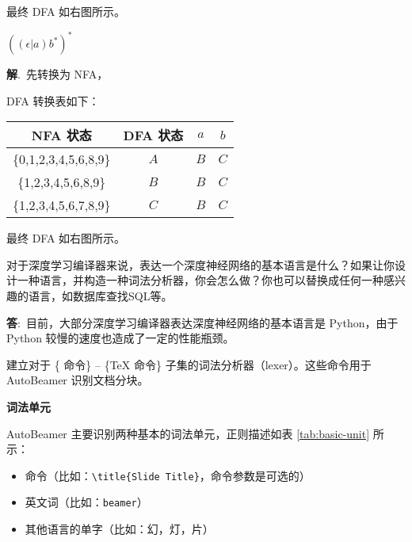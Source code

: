 \documentclass[12pt,a4paper]{article}
\newenvironment{problems}{\begin{list}{}{\renewcommand{\makelabel}[1]{\textbf{##1}\hfil}}}{\end{list}}
\newenvironment{steps}{\begin{list}{}{\renewcommand{\makelabel}[1]{##1)\hfil}}}{\end{list}}
\providecommand{\ans}{\textbf{答}:~}
\providecommand{\sol}{\textbf{解}.~}
\begin{document}
\begin{problems}
\begin{steps}
\begin{multicols}{2}
        最终 DFA 如右图所示。

        

        \end{multicols}

        \item[c] $((\epsilon|a)b^*)^*$ 
        
        \sol 先转换为 NFA，

        

        \begin{multicols}{2}
            DFA 转换表如下：
        
        \begin{tabular}{cc|cc}
            \hline
            NFA 状态 & DFA 状态 & $a$ & $b$ \\
            \hline
            \{0,1,2,3,4,5,6,8,9\} & $A$ & $B$ & $C$ \\
            \{1,2,3,4,5,6,8,9\} & $B$ & $B$ & $C$ \\
            \{1,2,3,4,5,6,7,8,9\} & $C$ & $B$ & $C$ \\
            \hline
        \end{tabular}

        最终 DFA 如右图所示。

        

        \end{multicols}


    \end{steps} 
    \item[2] 对于深度学习编译器来说，表达一个深度神经网络的基本语言是什么？如果让你设计一种语言，并构造一种词法分析器，你会怎么做？你也可以替换成任何一种感兴趣的语言，如数据库查找SQL等。
    
    \ans 目前，大部分深度学习编译器表达深度神经网络的基本语言是 Python，由于 Python 较慢的速度也造成了一定的性能瓶颈。\cite{Li2021} 


    建立对于 \{\LaTeXe{} 命令\} -- \{\TeX{} 命令\} 子集的词法分析器（lexer）。这些命令用于 \textsf{AutoBeamer} 识别文档分块。

\textbf{词法单元}

\textsf{AutoBeamer} 主要识别两种基本的词法单元，正则描述如表 \ref{tab:basic-unit} 所示：
\begin{itemize}
    \item 命令（比如：\verb"\title{Slide Title}"，命令参数是可选的）
    \item 英文词（比如：\verb"beamer"）
    \item 其他语言的单字（比如：幻，灯，片）
\end{itemize}


\end{problems}
\end{document}
